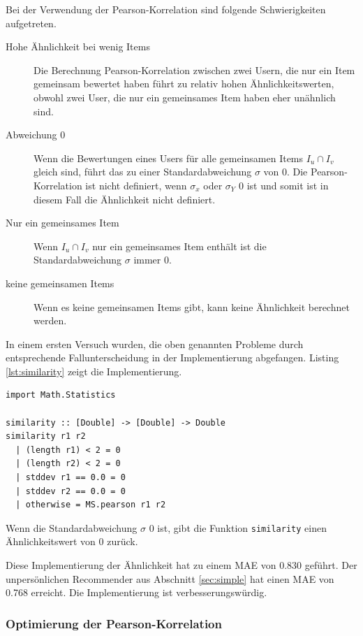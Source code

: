 \documentclass[a4paper, 12pt]{article}
\begin{document}
Bei der Verwendung der Pearson-Korrelation sind folgende Schwierigkeiten aufgetreten.

\begin{description}
\item[Hohe Ähnlichkeit bei wenig Items] Die Berechnung Pearson-Korrelation zwischen zwei Usern, die nur ein Item gemeinsam bewertet haben führt zu relativ hohen Ähnlichkeitswerten, obwohl zwei User, die nur ein gemeinsames Item haben eher unähnlich sind.
\item[Abweichung 0] Wenn die Bewertungen eines Users für alle gemeinsamen Items  $I_u \cap I_v$ gleich sind, führt das zu einer Standardabweichung $\sigma$ von 0.  Die Pearson-Korrelation ist nicht definiert, wenn $\sigma_x$ oder $\sigma_Y$ 0 ist und somit ist in diesem Fall die Ähnlichkeit nicht definiert.
\item[Nur ein gemeinsames Item] Wenn $I_u \cap I_v$ nur ein gemeinsames Item enthält ist die Standardabweichung $\sigma$ immer 0.
\item[keine gemeinsamen Items] Wenn es keine gemeinsamen Items gibt, kann keine Ähnlichkeit berechnet werden.
\end{description}

In einem ersten Versuch wurden, die oben genannten Probleme durch entsprechende Fallunterscheidung in der Implementierung abgefangen. Listing \ref{lst:similarity} zeigt die Implementierung.

\begin{lstlisting}[caption=Similarity, label=lst:similarity]
import Math.Statistics

similarity :: [Double] -> [Double] -> Double
similarity r1 r2
  | (length r1) < 2 = 0
  | (length r2) < 2 = 0
  | stddev r1 == 0.0 = 0
  | stddev r2 == 0.0 = 0
  | otherwise = MS.pearson r1 r2

\end{lstlisting}

Wenn die Standardabweichung $\sigma$ 0 ist, gibt die Funktion \verb|similarity| einen Ähnlichkeitswert von 0 zurück.

Diese Implementierung der Ähnlichkeit hat zu einem MAE von 0.830 geführt. Der unpersönlichen Recommender aus Abschnitt \ref{sec:simple} hat einen MAE von 0.768 erreicht. Die Implementierung ist verbesserungswürdig. 

\subsubsection{Optimierung der Pearson-Korrelation}
\label{sec:optpearson}
\end{document}
